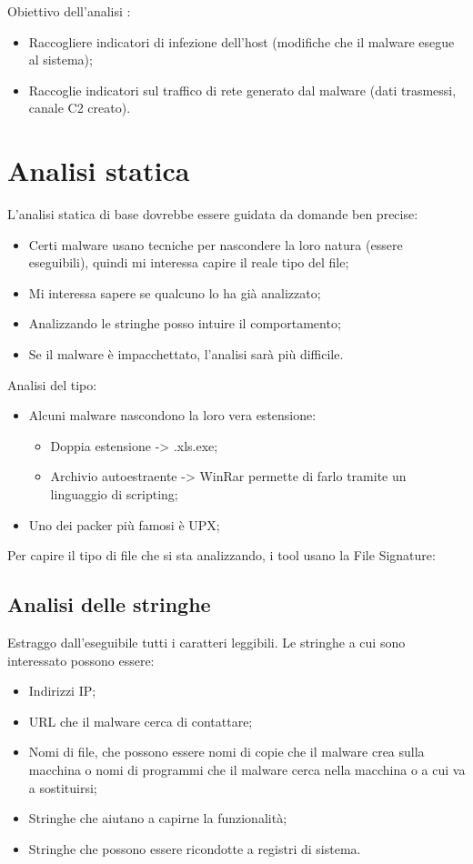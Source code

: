\documentclass[a4paper]{book}
\begin{document}
Obiettivo dell'analisi :
\begin{itemize}
    \item Raccogliere indicatori di infezione dell'host (modifiche che il malware esegue al sistema);
	\item Raccoglie indicatori sul traffico di rete generato dal malware (dati trasmessi, canale C2 creato).
\end{itemize}

\chapter{Analisi statica}
L'analisi statica di base dovrebbe essere guidata da domande ben precise:
\begin{itemize}
    \item Certi malware usano tecniche per nascondere la loro natura (essere eseguibili), quindi mi interessa capire il reale tipo del file;
	\item Mi interessa sapere se qualcuno lo ha già analizzato;
	\item Analizzando le stringhe posso intuire il comportamento;
	\item Se il malware è impacchettato, l'analisi sarà più difficile.
\end{itemize}
	
Analisi del tipo:
\begin{itemize}
    \item Alcuni malware nascondono la loro vera estensione:
    \begin{itemize}
        \item Doppia estensione -> .xls.exe;
		\item Archivio autoestraente -> WinRar permette di farlo tramite un linguaggio di scripting;
    \end{itemize}
	\item Uno dei packer più famosi è UPX;
\end{itemize}

Per capire il tipo di file che si sta analizzando, i tool usano la File Signature:

\section{Analisi delle stringhe} Estraggo dall'eseguibile tutti i caratteri leggibili. Le stringhe a cui sono interessato possono essere:
\begin{itemize}
    \item Indirizzi IP;
    \item URL che il malware cerca di contattare;
    \item Nomi di file, che possono essere nomi di copie che il malware crea sulla macchina o nomi di programmi che il malware cerca nella macchina o a cui va a sostituirsi;
    \item Stringhe che aiutano a capirne la funzionalità;
    \item Stringhe che possono essere ricondotte a registri di sistema.
\end{itemize}
\end{document}
